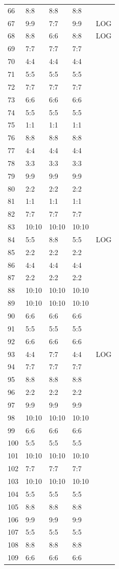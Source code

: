\documentclass{report}
\begin{document}
\begin{center}
\begin{longtable}{|l|l|l|l|l|}
66&8:8&8:8&8:8&\\
67&9:9&7:7&9:9&LOG\\
68&8:8&6:6&8:8&LOG\\
69&7:7&7:7&7:7&\\
70&4:4&4:4&4:4&\\
71&5:5&5:5&5:5&\\
72&7:7&7:7&7:7&\\
73&6:6&6:6&6:6&\\
74&5:5&5:5&5:5&\\
75&1:1&1:1&1:1&\\
76&8:8&8:8&8:8&\\
77&4:4&4:4&4:4&\\
78&3:3&3:3&3:3&\\
79&9:9&9:9&9:9&\\
80&2:2&2:2&2:2&\\
81&1:1&1:1&1:1&\\
82&7:7&7:7&7:7&\\
83&10:10&10:10&10:10&\\
84&5:5&8:8&5:5&LOG\\
85&2:2&2:2&2:2&\\
86&4:4&4:4&4:4&\\
87&2:2&2:2&2:2&\\
88&10:10&10:10&10:10&\\
89&10:10&10:10&10:10&\\
90&6:6&6:6&6:6&\\
91&5:5&5:5&5:5&\\
92&6:6&6:6&6:6&\\
93&4:4&7:7&4:4&LOG\\
94&7:7&7:7&7:7&\\
95&8:8&8:8&8:8&\\
96&2:2&2:2&2:2&\\
97&9:9&9:9&9:9&\\
98&10:10&10:10&10:10&\\
99&6:6&6:6&6:6&\\
100&5:5&5:5&5:5&\\
101&10:10&10:10&10:10&\\
102&7:7&7:7&7:7&\\
103&10:10&10:10&10:10&\\
104&5:5&5:5&5:5&\\
105&8:8&8:8&8:8&\\
106&9:9&9:9&9:9&\\
107&5:5&5:5&5:5&\\
108&8:8&8:8&8:8&\\
109&6:6&6:6&6:6&\\

\end{longtable}
\end{center}
\end{document}
